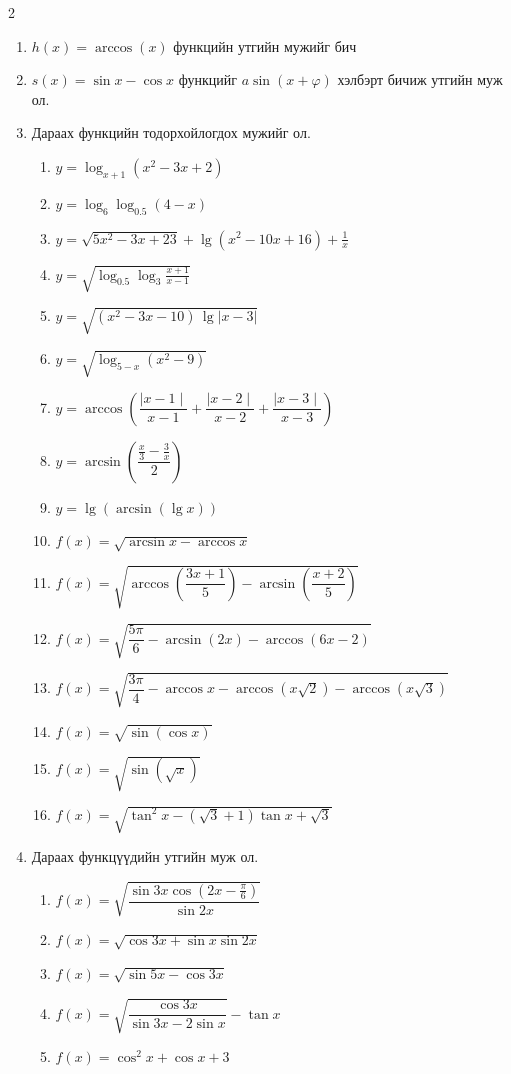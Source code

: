 \begin{multicols}{2}
\begin{enumerate}
\item $h(x) = \arccos(x)$ функцийн утгийн мужийг бич
\item $s(x) = \sin x - \cos x$ функцийг $a\sin (x+\varphi)$ хэлбэрт бичиж утгийн муж ол.
\item Дараах функцийн тодорхойлогдох мужийг ол.
\begin{enumerate}
  \item $y = \log_{x+1}(x^2 - 3x + 2)$ 
  \item $y = \log_6\log_{0.5}(4-x)$ 
  \item $y = \sqrt{5x^2-3x+23}+\lg(x^2 - 10x +16)+\frac{1}{x}$
  \item $y = \sqrt{\log_{0.5}\log_{3}\frac{x+1}{x-1}}$ 
  \item $ y=\sqrt{(x^2-3x-10)\,\lg|x-3|} $
  \item $y = \sqrt{\log_{5-x}(x^2 -9)}$ 
  \item $y = \arccos\!\left(\dfrac{\mid x-1\mid }{x-1} + \dfrac{\mid x-2\mid }{x-2} + \dfrac{\mid x-3\mid }{x-3}\right)$
  \item $y = \arcsin\!\left(\dfrac{\tfrac{x}{3} - \tfrac{3}{x}}{2}\right)$
  \item $y = \lg(\arcsin(\lg x))$
  \item $f(x) = \sqrt{\arcsin x - \arccos x}$
  \item $f(x) = \sqrt{\arccos\!\left(\dfrac{3x+1}{5}\right) - \arcsin\!\left(\dfrac{x+2}{5}\right)}$
  \item $f(x) = \sqrt{\dfrac{5\pi}{6} - \arcsin(2x) - \arccos(6x-2)}$
  \item $f(x) = \sqrt{\dfrac{3\pi}{4} - \arccos x - \arccos(x\sqrt{2}) - \arccos(x\sqrt{3})}$
  \item $f(x) = \sqrt{\sin(\cos x)}$
  \item $f(x) = \sqrt{\sin(\sqrt{x})}$
  \item $f(x) = \sqrt{\tan^2 x - (\sqrt{3}+1)\tan x + \sqrt{3}}$
\end{enumerate}
\item Дараах функцүүдийн утгийн муж ол.
\begin{enumerate}
    \item $f(x) = \sqrt{\dfrac{\sin 3x \cos\!\left(2x - \tfrac{\pi}{6}\right)}{\sin 2x}}$
  \item $f(x) = \sqrt{\cos 3x + \sin x \sin 2x}$
  \item $f(x) = \sqrt{\sin 5x - \cos 3x}$
  \item $f(x) = \sqrt{\dfrac{\cos 3x}{\sin 3x - 2\sin x}} - \tan x$
  \item $f(x) = \cos^2 x + \cos x + 3$

\end{enumerate}
\end{enumerate}
\end{multicols}
